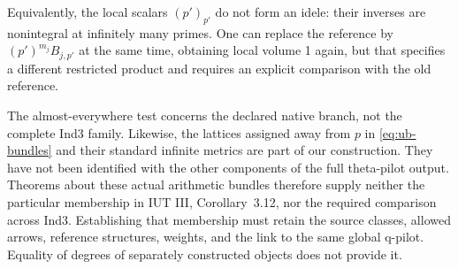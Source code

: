 Equivalently, the local scalars $(p')_{p'}$ do not form an idele:
their inverses are nonintegral at infinitely many primes. One
can replace the reference by $(p')^{m_j}B_{j,p'}$ at the same time,
obtaining local volume 1 again, but that specifies a different
restricted product and requires an explicit comparison with the
old reference.

\begin{remark}
The almost-everywhere test concerns the declared native branch,
not the complete Ind3 family. Likewise, the lattices assigned
away from $p$ in \eqref{eq:ub-bundles} and their standard infinite
metrics are part of our construction. They have not been identified
with the other components of the full theta-pilot output.
Theorems about these actual arithmetic bundles therefore supply
neither the particular membership in IUT III, Corollary~3.12,
nor the required comparison across Ind3. Establishing that
membership must retain the source classes, allowed arrows,
reference structures, weights, and the link to the same global
q-pilot. Equality of degrees of separately constructed objects
does not provide it.
\end{remark}
